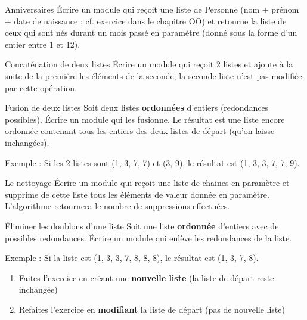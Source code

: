 \begin{Exercice}{Anniversaires}
		Écrire un module qui reçoit une liste de Personne (nom + prénom + date
		de naissance ; cf. exercice dans le chapitre OO) et retourne la liste
		de ceux qui sont nés durant un mois passé en paramètre (donné sous la 
		forme d'un entier entre 1	et 12).
\end{Exercice}
	
\begin{Exercice}{Concaténation de deux listes}
		Écrire un module qui reçoit 2 listes et ajoute
		à la suite de la première les éléments de la seconde; la seconde liste
		n'est pas modifiée par cette opération.
\end{Exercice}

\begin{Exercice}{Fusion de deux listes}
		Soit deux listes \textbf{ordonnées}
		d'entiers (redondances possibles). Écrire un module
		qui les fusionne. Le résultat est une liste encore ordonnée contenant
		tous les entiers des deux listes de départ (qu'on
		laisse inchangées).

		Exemple : Si les 2 listes sont (1, 3, 7, 7) et (3, 9), 
		le résultat est (1, 3, 3, 7, 7, 9).
\end{Exercice}

\begin{Exercice}{Le nettoyage}
	Écrire un module qui reçoit une liste de chaines en paramètre et
	supprime de cette liste tous les éléments de valeur donnée en
	paramètre. L'algorithme retournera le nombre de
	suppressions effectuées.
\end{Exercice}
	
\begin{Exercice}{Éliminer les doublons d'une liste}
		Soit une liste \textbf{ordonnée} 
		d'entiers avec de possibles redondances. Écrire un
		module qui enlève les redondances de la liste.
				
		Exemple : Si la liste est (1, 3, 3, 7, 8, 8, 8),
		le résultat est (1, 3, 7, 8).

		\begin{enumerate}[label=\alph*)]
			\item 
				Faites l'exercice en créant une \textbf{nouvelle
				liste} (la liste de départ reste inchangée)
			\item 
				Refaites l'exercice en \textbf{modifiant}
				la liste de départ (pas de nouvelle liste)
		\end{enumerate}
\end{Exercice}

